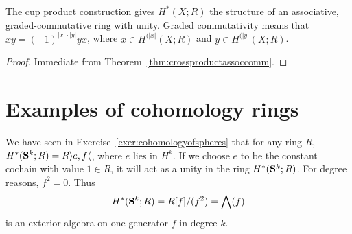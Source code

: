 \documentclass[a4paper,openany]{scrbook}
\begin{document}
\begin{corollary}\label{cor:cupproduct}
The cup product construction gives $H^*(X;R)$ the structure of an associative, graded-commutative ring with unity. Graded commutativity means that $xy=(-1)^{|x|\cdot|y|}yx$, where $x \in H^{(|x|}(X;R)$ and $y \in H^{(|y|}(X;R)$.
\end{corollary}
\begin{proof}
Immediate from Theorem~\ref{thm:crossproductassoccomm}.
\end{proof}

\section{Examples of cohomology rings}

\begin{example}\label{ex:cohomologyringofspheres}
We have seen in Exercise~\ref{exer:cohomologyofspheres} that for any ring $R$, $H^*(\S^k;R) = R\rangle e,f\langle$, where $e$ lies in $H^k$. If we choose $e$ to be the constant cochain with value $1 \in R$, it will act as a unity in the ring $H^*(\S^k;R)$. For degree reasons, $f^2=0$. Thus
\[
H^*(\S^k;R) = R[f]/(f^2) = \bigwedge(f)
\]
is an exterior algebra on one generator $f$ in degree $k$.
\end{example}
\end{document}
